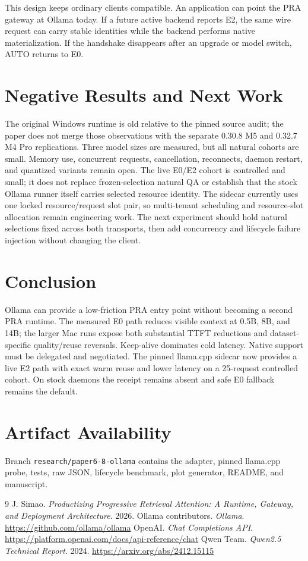 \documentclass[10pt]{article}
\begin{document}
This design keeps ordinary clients compatible. An application can point the PRA
gateway at Ollama today. If a future active backend reports E2, the same wire
request can carry stable identities while the backend performs native
materialization. If the handshake disappears after an upgrade or model switch,
AUTO returns to E0.

\section{Negative Results and Next Work}
The original Windows runtime is old relative to the pinned source audit; the
paper does not merge those observations with the separate 0.30.8 M5 and 0.32.7
M4 Pro replications. Three model sizes are measured, but all natural cohorts are small.
Memory use, concurrent requests, cancellation, reconnects, daemon restart, and
quantized variants remain open. The live E0/E2 cohort is controlled and small;
it does not replace frozen-selection natural QA or establish that the stock
Ollama runner itself carries selected resource identity. The sidecar currently
uses one locked resource/request slot pair, so multi-tenant scheduling and
resource-slot allocation remain engineering work. The next experiment should
hold natural selections fixed across both transports, then add concurrency and
lifecycle failure injection without changing the client.

\section{Conclusion}
Ollama can provide a low-friction PRA entry point without becoming a second PRA
runtime. The measured E0 path reduces visible context at 0.5B, 8B, and 14B;
the larger Mac runs expose both substantial TTFT reductions and dataset-specific
quality/reuse reversals. Keep-alive dominates cold latency. Native support must
be delegated and negotiated. The pinned llama.cpp sidecar now provides a live
E2 path with exact warm reuse and lower latency on a 25-request controlled
cohort. On stock daemons the receipt remains absent and safe E0 fallback remains
the default.

\section*{Artifact Availability}
Branch \texttt{research/paper6-8-ollama} contains the adapter, pinned llama.cpp
probe, tests, raw JSON, lifecycle benchmark, plot generator, README, and
manuscript.

\begin{thebibliography}{9}
 J. Simao. \emph{Productizing Progressive Retrieval
Attention: A Runtime, Gateway, and Deployment Architecture}. 2026.
 Ollama contributors. \emph{Ollama}.
\url{https://github.com/ollama/ollama}
 OpenAI. \emph{Chat Completions API}.
\url{https://platform.openai.com/docs/api-reference/chat}
 Qwen Team. \emph{Qwen2.5 Technical Report}. 2024.
\url{https://arxiv.org/abs/2412.15115}
\end{thebibliography}
\end{document}

